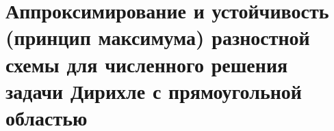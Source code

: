 \documentclass[__main__.tex]{subfiles}
\begin{document}
\section{Аппроксимирование и устойчивость (принцип максимума) разностной схемы для численного решения задачи Дирихле с прямоугольной областью}
\end{document}
